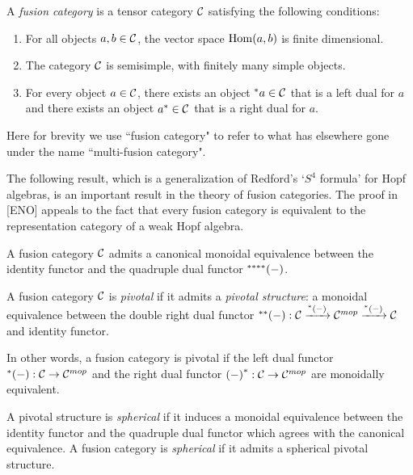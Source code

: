 \documentclass{amsart}
\begin{document}
\begin{definition}
A \emph{fusion category} is a tensor category $\mathcal C$ satisfying the following conditions:
\begin{enumerate}
\item For all objects $a, b \in \mathcal C$, the vector space $\operatorname{Hom}(a,b)$ is finite dimensional.
\item The category $\mathcal C$ is semisimple, with finitely many simple objects.
\item For every object $a \in \mathcal C$, there exists an object ${}^*{a} \in \mathcal C$ that is a left dual for $a$ and there exists an object ${a}^* \in \mathcal C$ that is a right dual for $a$.
\end{enumerate}
\end{definition}

\begin{remark}
Here for brevity we use ``fusion category" to refer to what has elsewhere gone under the name ``multi-fusion category".
\end{remark}

The following result, which is a generalization of Redford's `$S^4$ formula' for Hopf algebras, is an important result in the theory of fusion categories. The proof in [ENO] appeals to the fact that every fusion category is equivalent to the representation category of a weak Hopf algebra.  

\begin{theorem}
	A fusion category $\mathcal C$ admits a canonical monoidal equivalence between the identity functor and the quadruple dual functor ${}^{****}{(-)}$.
\end{theorem}



\begin{definition}
A fusion category $\mathcal C$ is \emph{pivotal} if it admits a {\em pivotal structure}: a monoidal equivalence between the double right dual functor ${}^{**}{(-)}: \mathcal C \xrightarrow{{}^*{(-)}} \mathcal C^{{mop}} \xrightarrow{{}^*{(-)}} \mathcal C$ and identity functor.
\end{definition}

In other words, a fusion category is pivotal if the left dual functor ${}^*{(-)}: \mathcal C \rightarrow \mathcal C^{{mop}}$ and the right dual functor ${(-)}^*: \mathcal C \rightarrow \mathcal C^{{mop}}$ are monoidally equivalent.


\begin{definition}
	A pivotal structure is {\em spherical} if it induces a monoidal equivalence between the identity functor and the quadruple dual functor which agrees with the canonical equivalence. A fusion category is {\em spherical} if it admits a spherical pivotal structure.  
\end{definition}
\end{document}
